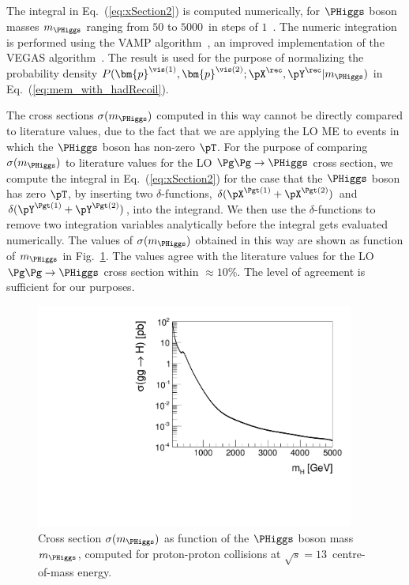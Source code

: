 The integral in Eq.~(\ref{eq:xSection2}) is computed numerically,
for $\PHiggs$ boson masses $m_{\PHiggs}$ ranging from $50$ to $5000$~\GeV in steps of $1$~\GeV.
The numeric integration is performed using the VAMP algorithm~\cite{VAMP},
an improved implementation of the VEGAS algorithm~\cite{VEGAS}.
The result is used for the purpose of normalizing the probability density $P(\bm{p}^{\vis(1)},\bm{p}^{\vis(2)};\pX^{\rec},\pY^{\rec}|m_{\PHiggs})$
in Eq.~(\ref{eq:mem_with_hadRecoil}).

The cross sections $\sigma(m_{\PHiggs})$ computed in this way cannot 
be directly compared to literature values,
due to the fact that we are applying the LO ME to events in which the $\PHiggs$ boson has non-zero $\pT$.
For the purpose of comparing $\sigma(m_{\PHiggs})$ to literature
values for the LO $\Pg\Pg \to \PHiggs$ cross section,
we compute the integral in Eq.~(\ref{eq:xSection2}) for the case that the $\PHiggs$ boson has zero $\pT$,
by inserting two $\delta$-functions, $\delta(\pX^{\Pgt(1)} + \pX^{\Pgt(2)})$ and $\delta(\pY^{\Pgt(1)} + \pY^{\Pgt(2)})$, into the integrand.
We then use the $\delta$-functions to remove two integration variables analytically before the integral gets evaluated numerically.
The values of $\sigma(m_{\PHiggs})$ obtained in this way are shown as function of
$m_{\PHiggs}$ in Fig.~\ref{fig:xSection}.
The values agree with the literature values for the LO $\Pg\Pg \to
\PHiggs$ cross section within $\approx 10\%$. 
The level of agreement is sufficient for our purposes.

\begin{figure}
\begin{center}
\includegraphics*[height=74mm]{plots/makeSVfitMEM_xSectionPlot_log.pdf}
\end{center}
\caption{
  Cross section $\sigma(m_{\PHiggs})$ as function of the $\PHiggs$ boson mass $m_{\PHiggs}$,
  computed for proton-proton collisions at $\sqrt{s} = 13$~\TeV centre-of-mass energy.
}
\label{fig:xSection}
\end{figure}

